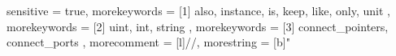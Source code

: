 {
  sensitive = true,
  morekeywords = [1]{
    also,
    instance,
    is,
    keep,
    like,
    only,
    unit
  },
  morekeywords = [2]{
    uint,
    int,
    string
  }, 
  morekeywords = [3]{
    connect_pointers,
    connect_ports
  },
  morecomment = [l]{//},
  morestring = [b]"
}